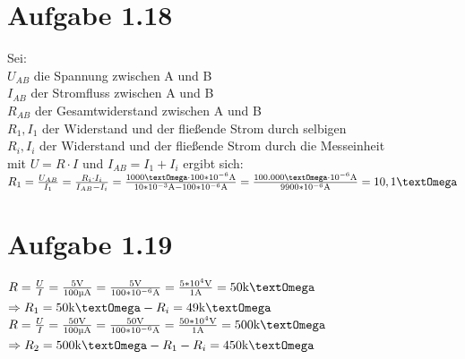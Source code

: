 \documentclass[]{article}
\newcommand{\rarr}{\Rightarrow}
\newcommand{\unit}[1]{\text{#1}}
\begin{document}
\section*{Aufgabe 1.18}
\par
	Sei:\\
	$U_{AB}$ die Spannung zwischen A und B\\
	$I_{AB}$ der Stromfluss zwischen A und B\\
	$R_{AB}$ der Gesamtwiderstand zwischen A und B\\
	$R_1, I_1$ der Widerstand und der fließende Strom durch selbigen\\
	$R_i, I_i$ der Widerstand und der fließende Strom durch die Messeinheit\\

	mit $U = R \cdot I$ und $I_{AB} = I_1 + I_i$ ergibt sich:\\
	$R_1 = \frac{U_{AB}}{I_1} = \frac{R_i \cdot I_i}{I_{AB} - I_i} = \frac{1000\unit{\textOmega} \cdot 100*10^{-6}\unit{A}}{10*10^{-3}\unit{A} - 100*10^{-6}\unit{A}} = \frac{100.000\unit{\textOmega} \cdot 10^{-6}\unit{A}}{9900*10^{-6}\unit{A}} = 10,1\unit{\textOmega}$

\section*{Aufgabe 1.19}
\par
	$R = \frac{U}{I} = \frac{5\unit{V}}{100\unit{\textmu A}} = \frac{5\unit{V}}{100*10^{-6}\unit{A}} = \frac{5*10^4\unit{V}}{1\unit{A}} = 50\unit{k\textOmega}$\\
	$\rarr R_1 = 50\unit{k\textOmega} - R_i = 49\unit{k\textOmega}$\\
	$R = \frac{U}{I} = \frac{50\unit{V}}{100\unit{\textmu A}} = \frac{50\unit{V}}{100*10^{-6}\unit{A}} = \frac{50*10^4\unit{V}}{1\unit{A}} = 500\unit{k\textOmega}$\\
	$\rarr R_2 = 500\unit{k\textOmega} - R_1 - R_i = 450\unit{k\textOmega}$\\
\end{document}
